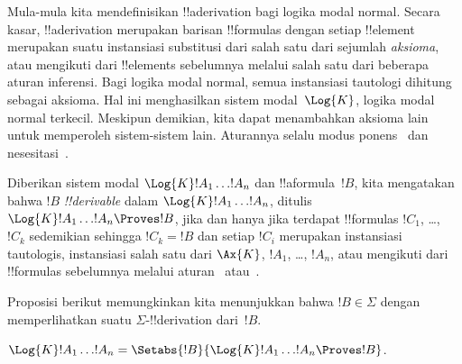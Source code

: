 \documentclass[../../../include/open-logic-section]{subfiles}
\begin{document}


Mula-mula kita mendefinisikan !!a{derivation} bagi logika modal normal. Secara
kasar, !!a{derivation} merupakan barisan !!{formula}s dengan setiap
!!{element} merupakan suatu instansiasi substitusi dari salah satu dari
sejumlah \emph{aksioma}, atau mengikuti dari !!{element}s sebelumnya melalui
salah satu dari beberapa aturan inferensi. Bagi logika modal normal, semua
instansiasi tautologi dihitung sebagai aksioma. Hal ini menghasilkan sistem
modal~$\Log{K}$, logika modal normal terkecil. Meskipun demikian, kita dapat
menambahkan aksioma lain untuk memperoleh sistem-sistem lain. Aturannya selalu
modus ponens~\MP{} dan nesesitasi~\Nec.

\begin{defn}
  Diberikan sistem modal $\Log{K} !A_1 \dots !A_n$ dan !!a{formula}~$!B$,
  kita mengatakan bahwa $!B$ \emph{!!{derivable}} dalam
  $\Log{K} !A_1 \dots !A_n$, ditulis
  $\Log{K} !A_1 \dots !A_n\Proves !B$, jika dan hanya jika terdapat
  !!{formula}s $!C_1$, \dots, $!C_k$ sedemikian sehingga $!C_k=!B$ dan setiap
  $!C_i$ merupakan instansiasi tautologis, instansiasi salah satu dari
  $\Ax{K}$, $!A_1$, \dots, $!A_n$, atau
  mengikuti dari !!{formula}s sebelumnya melalui aturan~\MP{} atau~\Nec.
\end{defn}

Proposisi berikut memungkinkan kita menunjukkan bahwa $!B\in\Sigma$ dengan
memperlihatkan suatu $\Sigma$-!!{derivation} dari~$!B$.

\begin{prop}
  $\Log{K} !A_1 \dots !A_n =
  \Setabs{!B}{\Log{K} !A_1 \dots !A_n \Proves !B}$.
\end{prop}
\end{document}
